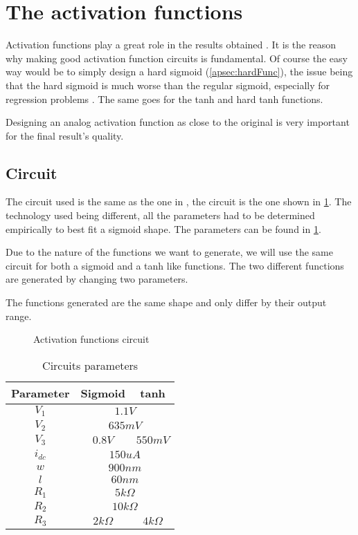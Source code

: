 \section{The activation functions}
\label{sec:af}

Activation functions play a great role in the results obtained \cite{af}. It is the reason why making good activation function circuits is fundamental. Of course the easy way would be to simply design a hard sigmoid (\cref{apsec:hardFunc}), the issue being that the hard sigmoid is much worse than the regular sigmoid, especially for regression problems \cite{hardSigm}. The same goes for the \ac{tanh} and hard \ac{tanh} functions.

Designing an analog activation function as close to the original is very important for the final result's quality.

\subsection{Circuit}

The circuit used is the same as the one in \cite{thesisRef}, the circuit is the one shown in \cref{circt:af}. The technology used being different, all the parameters had to be determined empirically to best fit a sigmoid shape. The parameters can be found in \cref{tab:afPar}.

Due to the nature of the functions we want to generate, we will use the same circuit for both a sigmoid and a \ac{tanh} like functions. The two different functions are generated by changing two parameters.

The functions generated are the same shape and only differ by their output range.

\begin{figure}[H]
  \centering
  
  \caption{Activation functions circuit}
  \label{circt:af}
\end{figure}

\begin{table}[H]
  \centering
  \begin{tabular}{|c|c|c|}
    \hline
    \rowcolor{gray}
    Parameter & Sigmoid & \ac{tanh} \\
    \hline
    $V_1$ & \multicolumn{2}{c|}{$1.1V$}\\
    \hline
    $V_2$ & \multicolumn{2}{c|}{$635mV$}\\
    \hline
    $V_3$ & $0.8V$ & $550mV$\\
    \hline
    $i_{dc}$ & \multicolumn{2}{c|}{$150uA$}\\
    \hline
    $w$ & \multicolumn{2}{c|}{$900nm$}\\
    \hline
    $l$ & \multicolumn{2}{c|}{$60nm$}\\
    \hline
    $R_1$ & \multicolumn{2}{c|}{$5k\Omega$}\\
    \hline
    $R_2$ & \multicolumn{2}{c|}{$10k\Omega$}\\
    \hline
    $R_3$ & $2k\Omega$ & $4k\Omega$\\
    \hline
  \end{tabular}
  \caption{Circuits parameters}
  \label{tab:afPar}
\end{table}

